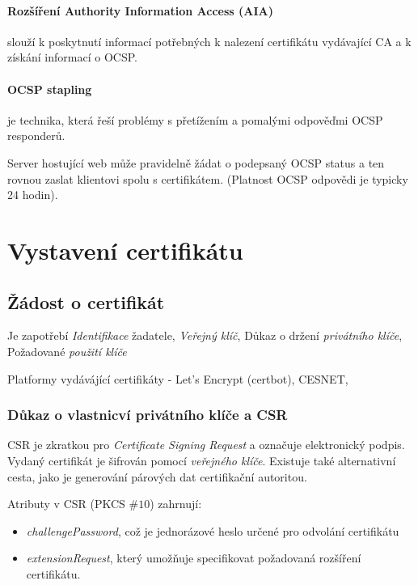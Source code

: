 \documentclass[10pt,a4paper]{article}
\begin{document}
\paragraph{Rozšíření Authority Information Access (AIA)} slouží k poskytnutí informací potřebných k nalezení certifikátu vydávající CA a k získání informací o OCSP.


\paragraph{OCSP stapling} je technika, která řeší problémy s přetížením a pomalými odpověďmi OCSP responderů. 

Server hostující web může pravidelně žádat o podepsaný OCSP status a ten rovnou zaslat klientovi spolu s certifikátem. (Platnost OCSP odpovědi je typicky 24 hodin).

\section{Vystavení certifikátu}

\subsection{Žádost o certifikát}

Je zapotřebí \textit{Identifikace} žadatele, \textit{Veřejný klíč}, Důkaz o držení \textit{privátního klíče}, Požadované \textit{použití klíče}

Platformy vydávájící certifikáty - Let’s Encrypt (certbot), CESNET, 

\subsubsection*{Důkaz o vlastnicví privátního klíče a CSR}

CSR je zkratkou pro \textit{Certificate Signing Request} a označuje elektronický podpis. Vydaný certifikát je šifrován pomocí \textit{veřejného klíče}. Existuje také alternativní cesta, jako je generování párových dat certifikační autoritou.



Atributy v CSR (PKCS $\#10$) zahrnují:
\begin{itemize}\setlength\itemsep{0em}
	\item \textit{challengePassword}, což je jednorázové heslo určené pro odvolání certifikátu
	\item \textit{extensionRequest}, který umožňuje specifikovat požadovaná rozšíření certifikátu.
\end{itemize}
\end{document}
